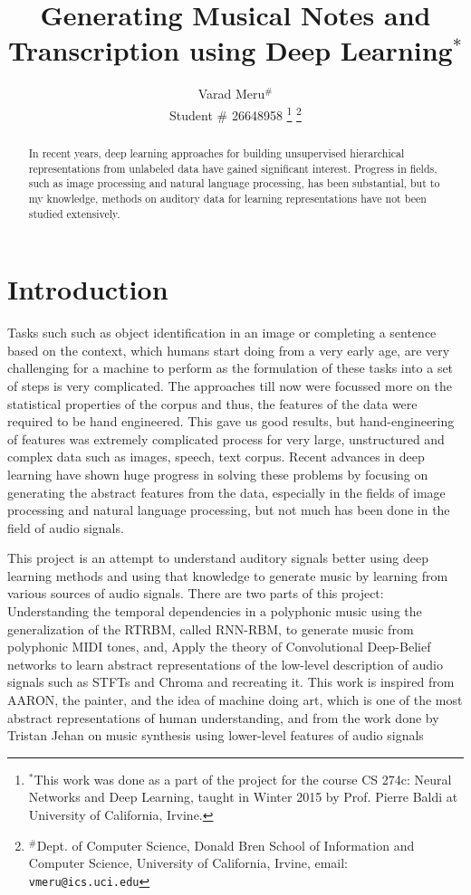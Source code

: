 \documentclass[letterpaper, 10 pt, conference]{ieeeconf}
\title{\LARGE \bf
Generating Musical Notes and Transcription using Deep Learning$^{*}$}
\author{Varad Meru$^{\#}$%
\\ {\small Student \# 26648958}
\thanks{$^{*}$This work was done as a part of the project for the course CS 274c: Neural Networks and Deep Learning, taught in Winter 2015 by Prof. Pierre Baldi at University of California, Irvine.}%
\thanks{$^{\#}$Dept. of Computer Science, Donald Bren School of Information and Computer Science, University of California, Irvine, email: {\tt\small vmeru@ics.uci.edu}}%
}
\begin{document}
\maketitle
\thispagestyle{empty}
\pagestyle{empty}

\begin{abstract}
In recent years, deep learning approaches for building unsupervised hierarchical representations from unlabeled data have gained significant interest. Progress in fields, such as image processing and natural language processing, has been substantial, but to my knowledge, methods on auditory data for learning representations have not been studied extensively. 
\end{abstract}
\section{Introduction}

Tasks such such as object identification in an image or completing a sentence based on the context, which humans start doing from a very early age, are very challenging for a machine to perform as the formulation of these tasks into a set of steps is very complicated. The approaches till now were focussed more on the statistical properties of the corpus and thus, the features of the data were required to be hand engineered. This gave us good results, but hand-engineering of features was extremely complicated process for very large, unstructured and complex data such as images, speech, text corpus. Recent advances in deep learning have shown huge progress in solving these problems by focusing on generating the abstract features from the data, especially in the fields of image processing and natural language processing, but not much has been done in the field of audio signals. 

This project is an attempt to understand auditory signals better using deep learning methods and using that knowledge to generate music by learning from various sources of audio signals. There are two parts of this project: Understanding the temporal dependencies in a polyphonic music using the generalization of the RTRBM, called RNN-RBM\cite{c8}, to generate music from polyphonic MIDI tones, and, Apply the theory of Convolutional Deep-Belief networks\cite{c1} to learn abstract representations of the low-level description of audio signals such as STFTs and Chroma and recreating it. This work is inspired from AARON, the painter,\cite{c5} and the idea of machine doing art, which is one of the most abstract representations of human understanding, and from the work done by Tristan Jehan\cite{c4} on music synthesis using lower-level features of audio signals
\end{document}
